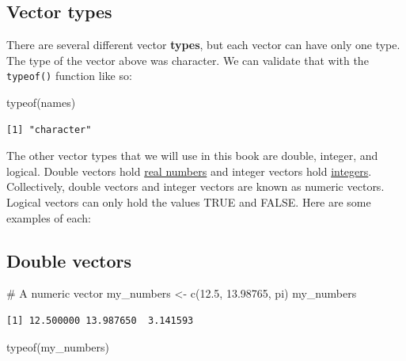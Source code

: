 \documentclass[
  letterpaper,
  DIV=11,
  numbers=noendperiod]{scrreprt}
\newenvironment{Shaded}{\begin{snugshade}}{\end{snugshade}}
\newcommand{\CommentTok}[1]{\textcolor[rgb]{0.37,0.37,0.37}{#1}}
\newcommand{\FloatTok}[1]{\textcolor[rgb]{0.68,0.00,0.00}{#1}}
\newcommand{\FunctionTok}[1]{\textcolor[rgb]{0.28,0.35,0.67}{#1}}
\newcommand{\NormalTok}[1]{\textcolor[rgb]{0.00,0.23,0.31}{#1}}
\newcommand{\OtherTok}[1]{\textcolor[rgb]{0.00,0.23,0.31}{#1}}
\begin{document}
\subsection{Vector types}\label{vector-types}

There are several different vector \textbf{types}, but each vector can
have only one type. The type of the vector above was character. We can
validate that with the \texttt{typeof()} function like so:

\begin{Shaded}
\begin{Highlighting}[]
\FunctionTok{typeof}\NormalTok{(names)}
\end{Highlighting}
\end{Shaded}

\begin{verbatim}
[1] "character"
\end{verbatim}

The other vector types that we will use in this book are double,
integer, and logical. Double vectors hold
\href{https://en.wikipedia.org/wiki/Real_number}{real numbers} and
integer vectors hold
\href{https://en.wikipedia.org/wiki/Integer}{integers}. Collectively,
double vectors and integer vectors are known as numeric vectors. Logical
vectors can only hold the values TRUE and FALSE. Here are some examples
of each:

\subsection{Double vectors}\label{double-vectors}

\begin{Shaded}
\begin{Highlighting}[]
\CommentTok{\# A numeric vector}
\NormalTok{my\_numbers }\OtherTok{\textless{}{-}} \FunctionTok{c}\NormalTok{(}\FloatTok{12.5}\NormalTok{, }\FloatTok{13.98765}\NormalTok{, pi)}
\NormalTok{my\_numbers}
\end{Highlighting}
\end{Shaded}

\begin{verbatim}
[1] 12.500000 13.987650  3.141593
\end{verbatim}

\begin{Shaded}
\begin{Highlighting}[]
\FunctionTok{typeof}\NormalTok{(my\_numbers)}
\end{Highlighting}
\end{Shaded}
\end{document}
